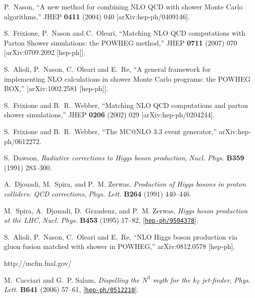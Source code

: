 \documentclass[paper]{JHEP3}
\begin{document}
\begin{thebibliography}{10}

  P.~Nason,
``A new method for combining NLO QCD with shower Monte Carlo algorithms,''
  JHEP {\bf 0411} (2004) 040
  [arXiv:hep-ph/0409146].

  S.~Frixione, P.~Nason and C.~Oleari,
``Matching NLO QCD computations with Parton Shower simulations: the POWHEG
method,''
  JHEP {\bf 0711} (2007) 070
  [arXiv:0709.2092 [hep-ph]].


  S.~Alioli, P.~Nason, C.~Oleari and E.~Re,
``A general framework for implementing NLO calculations in shower Monte Carlo
  programs: the POWHEG BOX,''
  [arXiv:1002.2581 [hep-ph]].

  S.~Frixione and B.~R.~Webber,
 ``Matching NLO QCD computations and parton shower simulations,''
  JHEP {\bf 0206} (2002) 029
  [arXiv:hep-ph/0204244].

  S.~Frixione and B.~R.~Webber,
  ``The MC@NLO 3.3 event generator,''
  arXiv:hep-ph/0612272.

S.~Dawson, {\it {Radiative corrections to Higgs boson production}},  {\em Nucl.
  Phys.} {\bf B359} (1991) 283--300.

A.~Djouadi, M.~Spira, and P.~M. Zerwas, {\it {Production of Higgs bosons in
  proton colliders: QCD corrections}},  {\em Phys. Lett.} {\bf B264} (1991)
  440--446.

M.~Spira, A.~Djouadi, D.~Graudenz, and P.~M. Zerwas, {\it {Higgs boson
  production at the LHC}},  {\em Nucl. Phys.} {\bf B453} (1995) 17--82,
  [\href{http://xxx.lanl.gov/abs/hep-ph/9504378}{{\tt hep-ph/9504378}}].



  S.~Alioli, P.~Nason, C.~Oleari and E.~Re,
``NLO Higgs boson production via gluon fusion matched with shower in
  POWHEG,''
  arXiv:0812.0578 [hep-ph].

  http://mcfm.fnal.gov/


M.~Cacciari and G.~P. Salam, {\it {Dispelling the $N^3$ myth for the $k_T$
  jet-finder}},  {\em Phys. Lett.} {\bf B641} (2006) 57--61,
  [\href{http://xxx.lanl.gov/abs/hep-ph/0512210}{{\tt hep-ph/0512210}}].





\end{thebibliography}
\end{document}
